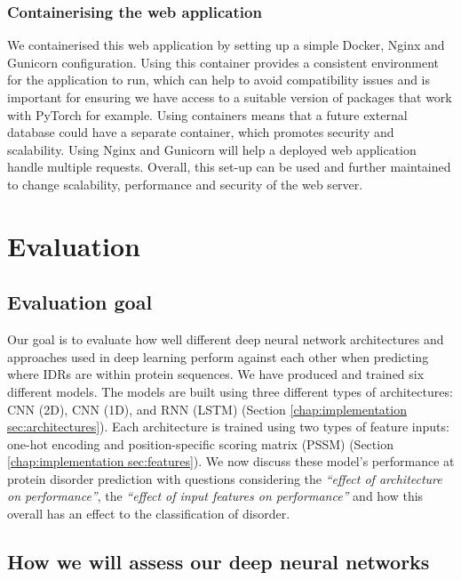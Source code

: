 \documentclass{l4proj}
\begin{document}
\subsection{Containerising the web application}

We containerised this web application by setting up a simple Docker, Nginx and Gunicorn configuration. Using this container provides a consistent environment for the application to run, which can help to avoid compatibility issues and is important for ensuring we have access to a suitable version of packages that work with PyTorch for example. Using containers means that a future external database could have a separate container, which promotes security and scalability. Using Nginx and Gunicorn will help a deployed web application handle multiple requests. Overall, this set-up can be used and further maintained to change scalability, performance and security of the web server.




\chapter{Evaluation}
\label{chap:evaluation}

\section{Evaluation goal}

Our goal is to evaluate how well different deep neural network architectures and approaches used in deep learning perform against each other when predicting where IDRs are within protein sequences. We have produced and trained six different models. The models are built using three different types of architectures: CNN (2D), CNN (1D), and RNN (LSTM) (Section \ref{chap:implementation sec:architectures}). Each architecture is trained using two types of feature inputs: one-hot encoding and position-specific scoring matrix (PSSM) (Section \ref{chap:implementation sec:features}). We now discuss these model’s performance at protein disorder prediction with questions considering the \textit{“effect of architecture on performance”}, the \textit{“effect of input features on performance”} and how this overall has an effect to the classification of disorder.

\section{How we will assess our deep neural networks}
\end{document}
